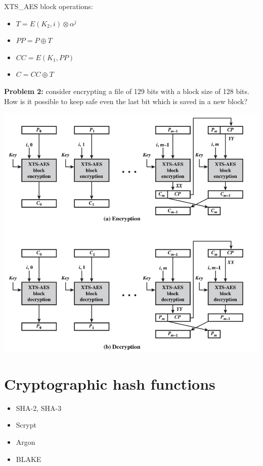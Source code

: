 \documentclass[10pt,a4paper]{article}
\begin{document}
XTS\_AES block operations:
\begin{itemize}
\item $T = E(K_2,i) \otimes \alpha^j$
\item $PP = P \oplus T$
\item $CC = E(K_1,PP)$
\item $C = CC \oplus T$
\end{itemize}
\newpage
\textbf{Problem 2:} consider encrypting a file of 129 bits with a block size of 128 bits. How is it possible to keep safe even the last bit which is saved in a new block?
\begin{center}
\includegraphics[scale=0.45]{img/XTS-mode.png}
\end{center}
\newpage
\section{Cryptographic hash functions}
\begin{itemize}
\item SHA-2, SHA-3
\item Scrypt
\item Argon
\item BLAKE
\end{itemize}
\end{document}
